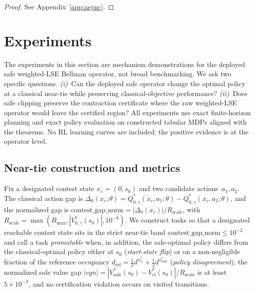 \documentclass{article}
\theoremstyle{remark}
\begin{document}
\begin{proof}
See Appendix~\ref{app:async}.
\end{proof}

\clearpage
\section{Experiments}
\label{sec:experiments}
\label{sec:exp-discussion} %

The experiments in this section are mechanism demonstrations for the
deployed safe weighted-LSE Bellman operator, not broad benchmarking.
We ask two specific questions.
\emph{(i)}~Can the deployed safe operator change the optimal policy at a
classical near-tie while preserving classical-objective performance?
\emph{(ii)}~Does safe clipping preserve the contraction certificate
where the raw weighted-LSE operator would leave the certified region?
All experiments use exact finite-horizon planning and exact policy
evaluation on constructed tabular MDPs aligned with the theorems.
No RL learning curves are included; the positive evidence is at the
operator level.

\subsection{Near-tie construction and metrics}
\label{sec:exp-principles}

Fix a designated contest state $x_c=(0,s_0)$ and two candidate
actions~$a_1,a_2$. The classical action gap is
$\Delta_0(x_c;\theta) = Q^*_{0,\gamma}(x_c,a_1;\theta)
- Q^*_{0,\gamma}(x_c,a_2;\theta)$,
and the normalized gap is
$\mathrm{contest\_gap\_norm}=|\Delta_0(x_c)|/R_\mathrm{scale}$,
with $R_\mathrm{scale}=\max(R_\mathrm{max},|V^*_{0,\gamma}(s_0)|,10^{-8})$.
We construct tasks so that a designated reachable contest state sits
in the strict near-tie band $\mathrm{contest\_gap\_norm}\le 10^{-2}$
and call a task \emph{promotable} when, in addition, the safe-optimal
policy differs from the classical-optimal policy either at $s_0$
(\emph{start-state flip}) or on a non-negligible fraction of the
reference occupancy
$d_\mathrm{ref}=\tfrac12 d^{\pi^*_\mathrm{cl}}+\tfrac12 d^{\pi^*_\mathrm{safe}}$
(\emph{policy disagreement}), the normalized safe value gap
$|vgn|=|V^*_\mathrm{safe}(s_0)-V^*_\mathrm{cl}(s_0)|/R_\mathrm{scale}$
is at least $5\times 10^{-3}$, and no certification violation occurs
on visited transitions.
\end{document}
